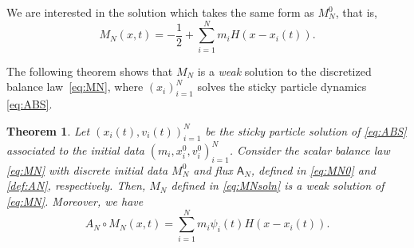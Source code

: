 \documentclass[10pt,a4paper]{amsart}
\newtheorem{theorem}{Theorem}[section]
\def\A{\mathsf{A}}
\begin{document}
	We are interested in the solution which takes the same form as $M_N^0$, that is,
	\begin{equation}
		\label{eq:MNsoln}
		M_N(x,t) = -\frac12+\sum_{i=1}^{N} m_i H(x-x_i(t)).
	\end{equation}
	
	The following theorem shows that $M_N$ is a \emph{weak} solution to the discretized balance law~\eqref{eq:MN}, where $(x_i)_{i=1}^N$ solves the sticky particle dynamics \eqref{eq:ABS}.

	\begin{theorem} \label{thm:discrete}
		Let $(x_i(t),v_i(t))_{i=1}^{N}$ be the sticky particle solution of \eqref{eq:ABS} associated to the initial data $(m_i, x_i^0,v_i^0)_{i=1}^{N}$. 
		Consider the scalar balance law \eqref{eq:MN} with discrete initial data $M_N^0$ and flux $\A_N$, defined in \eqref{eq:MN0} and \eqref{def:AN}, respectively.
		Then, $M_N$ defined in \eqref{eq:MNsoln} is a weak solution of \eqref{eq:MN}. Moreover, we have
		\begin{equation}\label{e:QN}
			A_N\circ M_N (x,t) = \sum_{i=1}^{N} m_i \psi_i(t)H(x-x_i(t)).
		\end{equation}
	\end{theorem}
\end{document}
